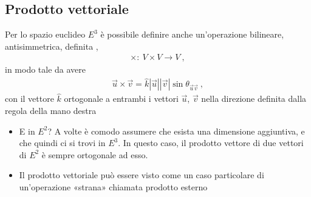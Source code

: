 \documentclass[letterpaper,10pt,italian]{jupyterBook}
\begin{document}
\subsection{Prodotto vettoriale}
\label{\detokenize{ch/algebra/vector-algebra-euclidean-space:prodotto-vettoriale}}\label{\detokenize{ch/algebra/vector-algebra-euclidean-space:math-hs-algebra-vector-euclidean-space-vector-product}}
\sphinxAtStartPar
Per lo spazio euclideo \(E^3\) è possibile definire anche un’operazione bilineare, antisimmetrica, definita ,
\begin{equation*}
\begin{split}\times: \ V \times V \rightarrow V \ ,\end{split}
\end{equation*}
\sphinxAtStartPar
in modo tale da avere
\begin{equation*}
\begin{split}\vec{u} \times \vec{v} = \hat{k} |\vec{u}| |\vec{v}| \sin \theta_{\vec{u} \vec{v}} \ ,\end{split}
\end{equation*}
\sphinxAtStartPar
con il vettore \(\hat{k}\) ortogonale a entrambi i vettori \(\vec{u}\), \(\vec{v}\) nella direzione definita dalla regola della mano destra 
\begin{itemize}
\item {} 
\sphinxAtStartPar
{} E in \(E^2\)? A volte è comodo assumere che esista una dimensione aggiuntiva, e che quindi ci si trovi in \(E^3\). In questo caso, il prodotto vettore di due vettori di \(E^2\) è sempre ortogonale ad esso.

\item {} 
\sphinxAtStartPar
{} Il prodotto vettoriale può essere visto come un caso particolare di un’operazione «strana» chiamata prodotto esterno

\end{itemize}
\end{document}
